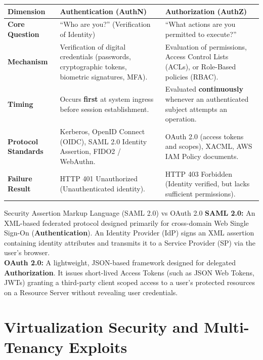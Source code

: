 \begin{center}
\begin{tabularx}{\textwidth}{>{\bfseries}l p{6.5cm} X}
\toprule
Dimension & Authentication (AuthN) & Authorization (AuthZ)\\
\midrule
Core Question & ``Who are you?'' (Verification of Identity) & ``What actions are you permitted to execute?''\\
Mechanism & Verification of digital credentials (passwords, cryptographic tokens, biometric signatures, MFA). & Evaluation of permissions, Access Control Lists (ACLs), or Role-Based policies (RBAC).\\
Timing & Occurs \textbf{first} at system ingress before session establishment. & Evaluated \textbf{continuously} whenever an authenticated subject attempts an operation.\\
Protocol Standards & Kerberos, OpenID Connect (OIDC), SAML 2.0 Identity Assertion, FIDO2 / WebAuthn. & OAuth 2.0 (access tokens and scopes), XACML, AWS IAM Policy documents.\\
Failure Result & HTTP 401 Unauthorized (Unauthenticated identity). & HTTP 403 Forbidden (Identity verified, but lacks sufficient permissions).\\
\bottomrule
\end{tabularx}
\end{center}

\begin{defbox}{Security Assertion Markup Language (SAML 2.0) vs OAuth 2.0}
\textbf{SAML 2.0:} An XML-based federated protocol designed primarily for cross-domain Web Single Sign-On (\textbf{Authentication}). An Identity Provider (IdP) signs an XML assertion containing identity attributes and transmits it to a Service Provider (SP) via the user's browser.\\
\textbf{OAuth 2.0:} A lightweight, JSON-based framework designed for delegated \textbf{Authorization}. It issues short-lived Access Tokens (such as JSON Web Tokens, JWTs) granting a third-party client scoped access to a user's protected resources on a Resource Server without revealing user credentials.
\end{defbox}

\section{Virtualization Security and Multi-Tenancy Exploits}
